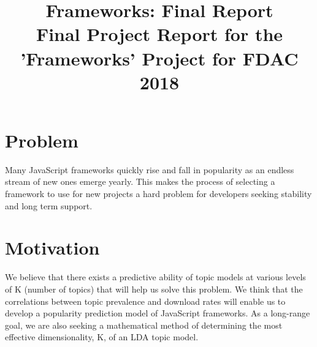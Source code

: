 \documentclass[conference]{IEEEtran}
\begin{document}
%

\title{Frameworks: Final Report\\
{\footnotesize Final Project Report for the 'Frameworks' Project for FDAC 2018 }
}

\author{
\and
{}
\and
{}
}

\maketitle

\section{Problem}
Many JavaScript frameworks quickly rise and fall in popularity as an endless stream of new ones emerge yearly. This makes the process of selecting a framework to use for new projects a hard problem for developers seeking stability and long term support. 

\section{Motivation}
We believe that there exists a predictive ability of topic models at various levels of K (number of topics) that will help us solve this problem. We think that the correlations between topic prevalence and download rates will enable us to develop a popularity prediction model of JavaScript frameworks. As a long-range goal, we are also seeking a mathematical method of determining the most effective dimensionality, K, of an LDA topic model.  
\end{document}
